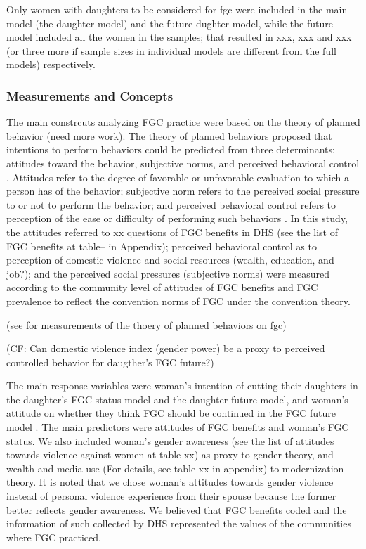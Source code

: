 \documentclass[12pt,]{article}
\begin{document}
Only women with daughters to be considered for fgc were included in the main model (the daughter model) and the future-dughter model, while the future model included all the women in the samples; that resulted in xxx, xxx and xxx (or three more if sample sizes in individual models are different from the full models) respectively.

\subsubsection{Measurements and Concepts}\label{measurements-and-concepts}

The main constrcuts analyzing FGC practice were based on the theory of planned behavior \cite{Ajze91, Ajze02, ThomMadd92} (need more work). The theory of planned behaviors proposed that intentions to perform behaviors could be predicted from three determinants:  attitudes toward the behavior, subjective norms, and perceived behavioral control \cite{Ajze91}.  Attitudes refer to the degree of favorable or unfavorable evaluation to which a person has of the behavior; subjective norm refers to the perceived social pressure to or not to perform the behavior; and perceived behavioral control refers to perception of the ease or difficulty of performing such behaviors \cite{Ajze91}.  In this study, the attitudes referred to xx questions of FGC benefits in DHS (see the list of FGC benefits at table-- in Appendix); perceived behavioral control as to perception of domestic violence and social resources (wealth, education, and job?); and the perceived social pressures (subjective norms) were measured according to the community level of attitudes of FGC benefits and FGC prevalence to reflect the convention norms of FGC under the convention theory. 

(see \cite{IloDarf18, PashPonn16} for measurements of the thoery of planned behaviors on fgc)

(CF: Can domestic violence index (gender power) be a proxy to perceived controlled behavior for daugther's FGC future?)

The main response variables were woman's intention of cutting their daughters in the daughter's FGC status model and the daughter-future model, and woman's attitude on whether they think FGC should be continued in the FGC future model .  The main predictors were attitudes of FGC benefits and woman's FGC status.  We also included woman's gender awareness (see the list of attitudes towards violence against women at table xx) as proxy to gender theory, and wealth and media use (For details, see table xx in appendix) to modernization theory.  It is noted that we chose woman's attitudes towards gender violence instead of personal violence experience from their spouse because the former better reflects gender awareness.  We believed that FGC benefits coded and the information of such collected by DHS represented the values of the communities where FGC practiced.
\end{document}
